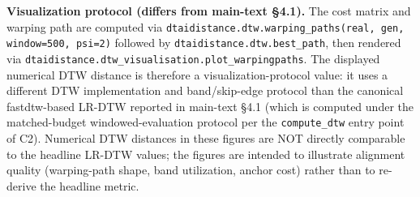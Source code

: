 \textbf{Visualization protocol (differs from main-text \S 4.1).} The
cost matrix and warping path are computed via
\texttt{dtaidistance.dtw.warping\_paths(real, gen, window=500, psi=2)}
followed by \texttt{dtaidistance.dtw.best\_path}, then rendered via
\texttt{dtaidistance.dtw\_visualisation.plot\_warpingpaths}. The
displayed numerical DTW distance is therefore a
visualization-protocol value: it uses a different DTW implementation
and band/skip-edge protocol than the canonical fastdtw-based LR-DTW
reported in main-text \S 4.1 (which is computed under the matched-budget
windowed-evaluation protocol per
the \texttt{compute\_dtw} entry point of C2). Numerical DTW
distances in these figures are NOT directly comparable to the headline
LR-DTW values; the figures are intended to illustrate alignment
quality (warping-path shape, band utilization, anchor cost) rather
than to re-derive the headline metric.


